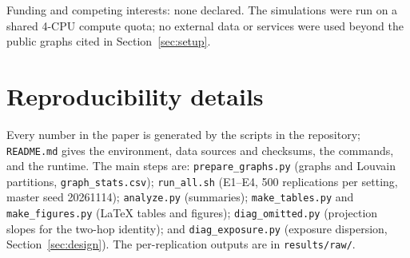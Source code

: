 \documentclass{article}
\begin{document}
\begin{ack}
Funding and competing interests: none declared. The simulations were run on a shared 4-CPU compute quota; no external data or services were used beyond the public graphs cited in Section~\ref{sec:setup}.
\end{ack}




\newpage
\appendix
\section{Reproducibility details}
\label{app:repro}
Every number in the paper is generated by the scripts in the repository; \texttt{README.md} gives the environment, data sources and checksums, the commands, and the runtime. The main steps are: \texttt{prepare\_graphs.py} (graphs and Louvain partitions, \texttt{graph\_stats.csv}); \texttt{run\_all.sh} (E1--E4, 500 replications per setting, master seed 20261114); \texttt{analyze.py} (summaries); \texttt{make\_tables.py} and \texttt{make\_figures.py} (LaTeX tables and figures); \texttt{diag\_omitted.py} (projection slopes for the two-hop identity); and \texttt{diag\_exposure.py} (exposure dispersion, Section~\ref{sec:design}). The per-replication outputs are in \texttt{results/raw/}.

{\footnotesize}

\begin{table}[h]
\caption{Bernoulli versus graph-cluster randomization on Stanford3 for the one-hop OLS and the quadratic OLS. Cluster coverage is CR1 and the target is the GATE.}
\label{tab:designs}
\centering
\small

\end{table}


\end{document}
